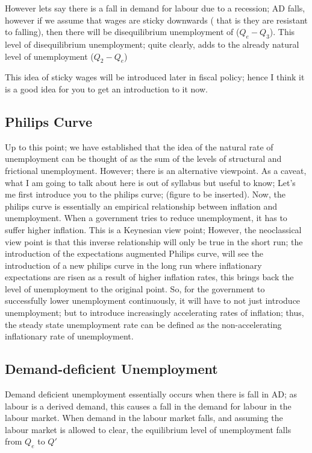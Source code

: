 However lets say there is a fall in demand for labour due to a recession; AD falls, however if we assume that wages are sticky downwards ( that is they are resistant to falling), then there will be disequilibrium unemployment of ($Q_e-Q_3$). This level of disequilibrium unemployment; quite clearly, adds to the already natural level of unemployment ($Q_2-Q_e$)

This idea of sticky wages will be introduced later in fiscal policy; hence I think it is a good idea for you to get an introduction to it now.
\subsection{Philips Curve}
Up to this point; we have established that the idea of the natural rate of unemployment can be thought of as the sum of the levels of structural and frictional unemployment. However; there is an alternative viewpoint. As a caveat, what I am going to talk about here is out of syllabus but useful to know; Let's me first introduce you to the philips curve; (figure to be inserted). Now, the philips curve is essentially an empirical relationship between inflation and unemployment. When a government tries to reduce unemployment, it has to suffer higher inflation. This is a Keynesian view point; However, the neoclassical view point is that this inverse relationship will only be true in the short run; the introduction of the expectations augmented Philips curve, will see the introduction of a new philips curve in the long run where inflationary expectations are risen as a result of higher inflation rates, this brings back the level of unemployment to the original point. So, for the government to successfully lower unemployment continuously, it will have to not just introduce unemployment; but to introduce increasingly accelerating rates of inflation; thus, the steady state unemployment rate can be defined as the non-accelerating inflationary rate of unemployment.
\subsection{Demand-deficient Unemployment}
Demand deficient unemployment essentially occurs when there is fall in AD; as labour is a derived demand, this causes a fall in the demand for labour in the labour market. When demand in the labour market falls, and assuming the labour market is allowed to clear, the equilibrium level of unemployment falls from $Q_e$ to $Q\prime$
